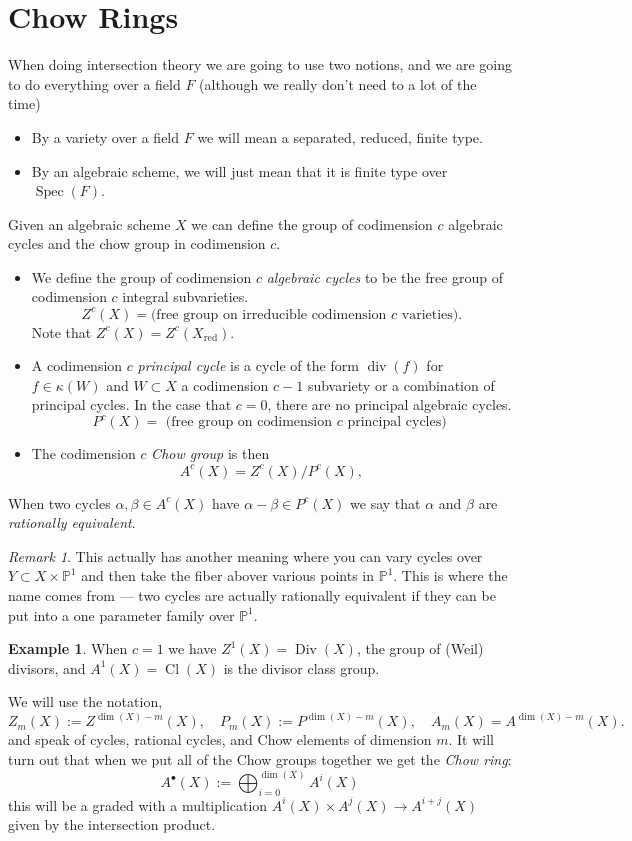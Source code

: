 \documentclass[12pt]{article}
\numberwithin{equation}{section}
\theoremstyle{definition}
\newtheorem{example}[theorem]{Example}
\theoremstyle{remark}
\newtheorem{remark}[theorem]{Remark}
\newcommand{\PP}{\mathbb{P}}
\newcommand{\Spec}{\operatorname{Spec}}
\newcommand{\Div}{\operatorname{Div}}
\renewcommand{\div}{\operatorname{div}}
\newcommand{\Cl}{\operatorname{Cl}}
\newcommand{\red}{\operatorname{red}}
\begin{document}
\section{Chow Rings}
When doing intersection theory we are going to use two notions, and we are going to do everything over a field $F$ (although we really don't need to a lot of the time)
\begin{itemize}
	\item By a variety over a field $F$ we will mean a separated, reduced, finite type. 
	\item By an algebraic scheme, we will just mean that it is finite type over $\Spec(F)$.
\end{itemize}
Given an algebraic scheme $X$ we can define the group of codimension $c$ algebraic cycles and the chow group in codimension $c$.
\begin{itemize}
	\item We define the group of codimension $c$ \emph{algebraic cycles} to be the free group of codimension $c$ integral subvarieties. 
	$$ Z^c(X) = \mbox{(free group on irreducible codimension $c$ varieties)}.$$
	Note that $Z^c(X) = Z^c(X_{\red})$. 
	\item A codimension $c$ \emph{principal cycle} is a cycle of the form $\div(f)$ for $f\in \kappa(W)$ and $W\subset X$ a codimension $c-1$ subvariety or a combination of principal cycles. In the case that $c=0$, there are no principal algebraic cycles. 
	$$ P^c(X) = \mbox{ (free group on codimension $c$ principal cycles) }$$
	\item The codimension $c$ \emph{Chow group} is then 
	$$ A^c(X) = Z^c(X)/P^c(X),$$
\end{itemize}

When two cycles $\alpha,\beta\in A^c(X)$ have $\alpha-\beta \in P^c(X)$ we say that $\alpha$ and $\beta$ are \emph{rationally equivalent}. 

\begin{remark}
	This actually has another meaning where you can vary cycles over $Y\subset X\times \PP^1$ and then take the fiber abover various points in $\PP^1$.
	This is where the name comes from --- two cycles are actually rationally equivalent if they can be put into a one parameter family over $\PP^1$. 
\end{remark}

\begin{example}
	When $c=1$ we have $Z^1(X) = \Div(X)$, the group of (Weil) divisors, and $A^1(X) = \Cl(X)$ is the divisor class group. 
\end{example}
We will use the notation,
$$ Z_m(X):=Z^{\dim(X)-m}(X), \quad P_m(X):=P^{\dim(X)-m}(X), \quad A_m(X) = A^{\dim(X)-m}(X).$$
and speak of cycles, rational cycles, and Chow elements of dimension $m$. 
It will turn out that when we put all of the Chow groups together we get the \emph{Chow ring}: 
 $$ A^{\bullet}(X) := \bigoplus_{i=0}^{\dim(X)} A^i(X) $$
this will be a graded with a multiplication $A^i(X)\times A^j(X) \to A^{i+j}(X)$ given by the intersection product.
\end{document}
